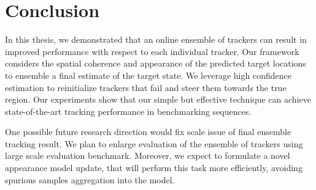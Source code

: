 \chapter{Conclusion}
\label{chapter::conclusions}

In this thesis, we demonstrated that an online ensemble of trackers can result
in improved performance with respect to each individual tracker. Our framework
considers the spatial coherence and appearance of the predicted target locations
to ensemble a final estimate of the target state. We leverage high confidence
estimation to reinitialize trackers that fail and steer them towards the true
region. Our experiments show that our simple but effective technique can achieve
state-of-the-art tracking performance in benchmarking sequences.

One possible future research direction would fix scale issue of final ensemble
tracking result. We plan to enlarge evaluation of the ensemble of trackers
using large scale evaluation benchmark. Moreover, we expect to formulate a novel
appearance model update, that will perform this task more efficiently, avoiding
spurious samples aggregation into the model.